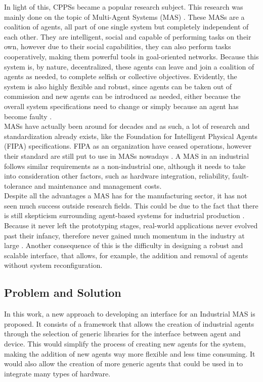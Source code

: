 In light of this, CPPSs became a popular research subject. This research was mainly done on the topic of Multi-Agent Systems (MAS) \cite{sakurada01} \cite{karnouskos01}. These MASs are a coalition of agents, all part of one single system but completely independent of each other. They are intelligent, social and capable of performing tasks on their own, however due to their social capabilities, they can also perform tasks cooperatively, making them powerful tools in goal-oriented networks. Because this system is, by nature, decentralized, these agents can leave and join a coalition of agents as needed, to complete selfish or collective objectives. Evidently, the system is also highly flexible and robust, since agents can be taken out of commission and new agents can be introduced as needed, either because the overall system specifications need to change or simply because an agent has become faulty \cite{paulo02}. \\

MASs have actually been around for decades and as such, a lot of research and standardization already exists, like the Foundation for Intelligent Physical Agents (FIPA) specifications. FIPA as an organization have ceased operations, however their standard are still put to use in MASs nowadays \cite{FIPA_website}. A MAS in an industrial follows similar requirements as a non-industrial one, although it needs to take into consideration other factors, such as hardware integration, reliability, fault-tolerance and maintenance and management costs.\\

Despite all the advantages a MAS has for the manufacturing sector, it has not seen much success outside research fields. This could be due to the fact that there is still skepticism surrounding agent-based systems for industrial production \cite{marschall01}. Because it never left the prototyping stages, real-world applications never evolved past their infancy, therefore never gained much momentum in the industry at large \cite{karnouskos02}. Another consequence of this is the difficulty in designing a robust and scalable interface, that allows, for example, the addition and removal of agents without system reconfiguration. %

\subsection{Problem and Solution}

In this work, a new approach to developing an interface for an Industrial MAS is proposed. It consists of a framework that allows the creation of industrial agents through the selection of generic libraries for the interface between agent and device. This would simplify the process of creating new agents for the system, making the addition of new agents way more flexible and less time consuming. It would also allow the creation of more generic agents that could be used in to integrate many types of hardware.